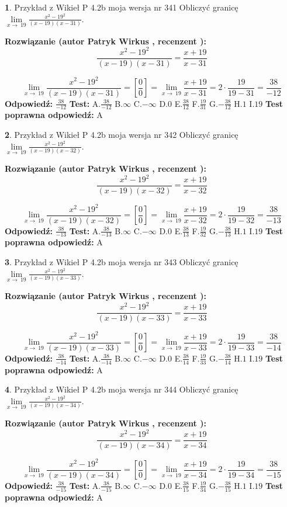 \documentclass[12pt, a4paper]{article}
\theoremstyle{definition} %
\newtheorem{zad}{}
\newcommand{\zadStart}[1]{\begin{zad}#1\newline}
\newcommand{\zadStop}{\end{zad}}
\newcommand{\rozwStart}[2]{\noindent \textbf{Rozwiązanie (autor #1 , recenzent #2): }\newline}
\newcommand{\rozwStop}{\newline}
\newcommand{\odpStart}{\noindent \textbf{Odpowiedź:}\newline}
\newcommand{\odpStop}{\newline}
\newcommand{\testStart}{\noindent \textbf{Test:}\newline}
\newcommand{\testStop}{\newline}
\newcommand{\kluczStart}{\noindent \textbf{Test poprawna odpowiedź:}\newline}
\newcommand{\kluczStop}{\newline}
\begin{document}
\zadStart{Przykład z Wikieł P 4.2b moja wersja nr 341}
Obliczyć granicę $\lim\limits_{x\to\ 19}\frac{x^{2}-19^{2}}{(x-19)(x-31)}$.
\zadStop
\rozwStart{Patryk Wirkus}{}
$$\frac{x^{2}-19^{2}}{(x-19)(x-31)}=\frac{x+19}{x-31}$$

$$\lim\limits_{x\to\ 19}\frac{x^{2}-19^{2}}{(x-19)(x-31)}=[\frac{0}{0}]=\lim\limits_{x\to\ 19}\frac{x+19}{x-31}=2 \cdot \frac{19}{19-31} = \frac{38}{-12}$$
\rozwStop
\odpStart
$\frac{38}{-12}$
\odpStop
\testStart
A.$\frac{38}{-12}$
B.$\infty$
C.$-\infty$
D.$0$
E.$\frac{38}{12}$
F.$\frac{19}{31}$
G.$-\frac{38}{12}$
H.$1$
I.$19$
\testStop
\kluczStart
A
\kluczStop



\zadStart{Przykład z Wikieł P 4.2b moja wersja nr 342}
Obliczyć granicę $\lim\limits_{x\to\ 19}\frac{x^{2}-19^{2}}{(x-19)(x-32)}$.
\zadStop
\rozwStart{Patryk Wirkus}{}
$$\frac{x^{2}-19^{2}}{(x-19)(x-32)}=\frac{x+19}{x-32}$$

$$\lim\limits_{x\to\ 19}\frac{x^{2}-19^{2}}{(x-19)(x-32)}=[\frac{0}{0}]=\lim\limits_{x\to\ 19}\frac{x+19}{x-32}=2 \cdot \frac{19}{19-32} = \frac{38}{-13}$$
\rozwStop
\odpStart
$\frac{38}{-13}$
\odpStop
\testStart
A.$\frac{38}{-13}$
B.$\infty$
C.$-\infty$
D.$0$
E.$\frac{38}{13}$
F.$\frac{19}{32}$
G.$-\frac{38}{13}$
H.$1$
I.$19$
\testStop
\kluczStart
A
\kluczStop



\zadStart{Przykład z Wikieł P 4.2b moja wersja nr 343}
Obliczyć granicę $\lim\limits_{x\to\ 19}\frac{x^{2}-19^{2}}{(x-19)(x-33)}$.
\zadStop
\rozwStart{Patryk Wirkus}{}
$$\frac{x^{2}-19^{2}}{(x-19)(x-33)}=\frac{x+19}{x-33}$$

$$\lim\limits_{x\to\ 19}\frac{x^{2}-19^{2}}{(x-19)(x-33)}=[\frac{0}{0}]=\lim\limits_{x\to\ 19}\frac{x+19}{x-33}=2 \cdot \frac{19}{19-33} = \frac{38}{-14}$$
\rozwStop
\odpStart
$\frac{38}{-14}$
\odpStop
\testStart
A.$\frac{38}{-14}$
B.$\infty$
C.$-\infty$
D.$0$
E.$\frac{38}{14}$
F.$\frac{19}{33}$
G.$-\frac{38}{14}$
H.$1$
I.$19$
\testStop
\kluczStart
A
\kluczStop



\zadStart{Przykład z Wikieł P 4.2b moja wersja nr 344}
Obliczyć granicę $\lim\limits_{x\to\ 19}\frac{x^{2}-19^{2}}{(x-19)(x-34)}$.
\zadStop
\rozwStart{Patryk Wirkus}{}
$$\frac{x^{2}-19^{2}}{(x-19)(x-34)}=\frac{x+19}{x-34}$$

$$\lim\limits_{x\to\ 19}\frac{x^{2}-19^{2}}{(x-19)(x-34)}=[\frac{0}{0}]=\lim\limits_{x\to\ 19}\frac{x+19}{x-34}=2 \cdot \frac{19}{19-34} = \frac{38}{-15}$$
\rozwStop
\odpStart
$\frac{38}{-15}$
\odpStop
\testStart
A.$\frac{38}{-15}$
B.$\infty$
C.$-\infty$
D.$0$
E.$\frac{38}{15}$
F.$\frac{19}{34}$
G.$-\frac{38}{15}$
H.$1$
I.$19$
\testStop
\kluczStart
A
\kluczStop
\end{document}
